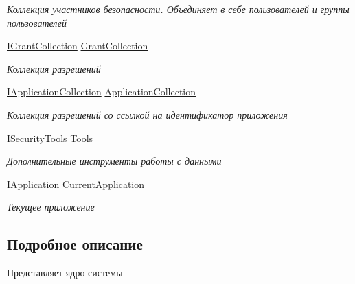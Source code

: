 \begin{DoxyCompactItemize}
\begin{DoxyCompactList}\small\item\em Коллекция участников безопасности. Объединяет в себе пользователей и группы пользователей \end{DoxyCompactList}\item 
\hyperlink{interface_security_1_1_interfaces_1_1_collections_1_1_i_grant_collection}{I\+Grant\+Collection} \hyperlink{class_security_1_1_core_security_ae606495ba6d6c826855c47c2fdc5f4a3}{Grant\+Collection}
\begin{DoxyCompactList}\small\item\em Коллекция разрешений \end{DoxyCompactList}\item 
\hyperlink{interface_security_1_1_interfaces_1_1_collections_1_1_i_application_collection}{I\+Application\+Collection} \hyperlink{class_security_1_1_core_security_a58b2f3d73cc4d9b241ee874df58600f7}{Application\+Collection}
\begin{DoxyCompactList}\small\item\em Коллекция разрешений со ссылкой на идентификатор приложения \end{DoxyCompactList}\item 
\hyperlink{interface_security_1_1_interfaces_1_1_i_security_tools}{I\+Security\+Tools} \hyperlink{class_security_1_1_core_security_ad64eb4770dc7bd1c8672580b426a166c}{Tools}
\begin{DoxyCompactList}\small\item\em Дополнительные инструменты работы с данными \end{DoxyCompactList}\item 
\hyperlink{interface_security_1_1_interfaces_1_1_model_1_1_i_application}{I\+Application} \hyperlink{class_security_1_1_core_security_a565133c41feb3b5599b0505b97b160fb}{Current\+Application}
\begin{DoxyCompactList}\small\item\em Текущее приложение \end{DoxyCompactList}\end{DoxyCompactItemize}


\subsection{Подробное описание}
Представляет ядро системы 



